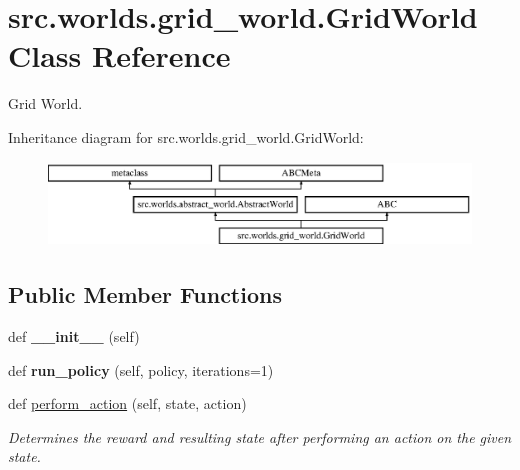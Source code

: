 \hypertarget{classsrc_1_1worlds_1_1grid__world_1_1_grid_world}{}\section{src.\+worlds.\+grid\+\_\+world.\+Grid\+World Class Reference}
\label{classsrc_1_1worlds_1_1grid__world_1_1_grid_world}


Grid World.  


Inheritance diagram for src.\+worlds.\+grid\+\_\+world.\+Grid\+World\+:\begin{figure}[H]
\begin{center}
\leavevmode
\includegraphics[height=2.240000cm]{classsrc_1_1worlds_1_1grid__world_1_1_grid_world}
\end{center}
\end{figure}
\subsection*{Public Member Functions}
\begin{DoxyCompactItemize}
\item 
\mbox{\label{classsrc_1_1worlds_1_1grid__world_1_1_grid_world_afe3c1b392afbc00fb9a76c14a6e07899}} 
def {\bfseries \+\_\+\+\_\+init\+\_\+\+\_\+} (self)
\item 
\mbox{\label{classsrc_1_1worlds_1_1grid__world_1_1_grid_world_a2ec82897b648609647d645f9b5835593}} 
def {\bfseries run\+\_\+policy} (self, policy, iterations=1)
\item 
def \hyperlink{classsrc_1_1worlds_1_1grid__world_1_1_grid_world_a93de8a88475e8ad0530fe703343028c9}{perform\+\_\+action} (self, state, action)
\begin{DoxyCompactList}\small\item\em Determines the reward and resulting state after performing an action on the given state. \end{DoxyCompactList}\end{DoxyCompactItemize}


